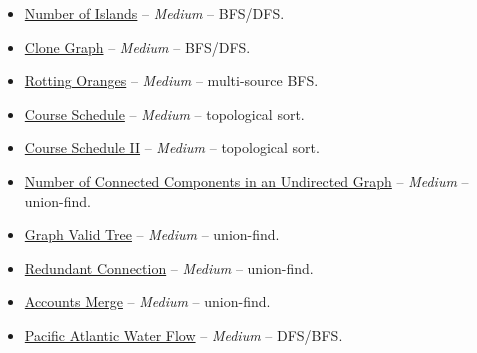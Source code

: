 \documentclass[11pt]{article}
\begin{document}
\begin{itemize}
  \item \href{https://leetcode.com/problems/number-of-islands/}{Number of Islands} -- \emph{Medium} -- BFS/DFS.
  \item \href{https://leetcode.com/problems/clone-graph/}{Clone Graph} -- \emph{Medium} -- BFS/DFS.
  \item \href{https://leetcode.com/problems/rotting-oranges/}{Rotting Oranges} -- \emph{Medium} -- multi-source BFS.
  \item \href{https://leetcode.com/problems/course-schedule/}{Course Schedule} -- \emph{Medium} -- topological sort.
  \item \href{https://leetcode.com/problems/course-schedule-ii/}{Course Schedule II} -- \emph{Medium} -- topological sort.
  \item \href{https://leetcode.com/problems/number-of-connected-components-in-an-undirected-graph/}{Number of Connected Components in an Undirected Graph} -- \emph{Medium} -- union-find.
  \item \href{https://leetcode.com/problems/graph-valid-tree/}{Graph Valid Tree} -- \emph{Medium} -- union-find.
  \item \href{https://leetcode.com/problems/redundant-connection/}{Redundant Connection} -- \emph{Medium} -- union-find.
  \item \href{https://leetcode.com/problems/accounts-merge/}{Accounts Merge} -- \emph{Medium} -- union-find.
  \item \href{https://leetcode.com/problems/pacific-atlantic-water-flow/}{Pacific Atlantic Water Flow} -- \emph{Medium} -- DFS/BFS.
\end{itemize}
\end{document}

